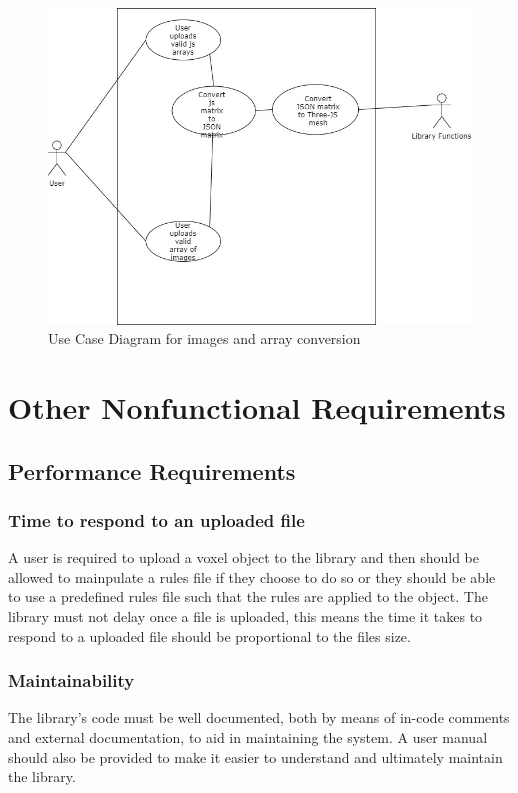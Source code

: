\documentclass[english]{article}
\begin{document}
	\begin{figure}[h]
		\includegraphics[width=\textwidth]{Use Cases/FileConversion.jpg}
		\caption{Use Case Diagram for images and array conversion }
	\end{figure}
	
	\pagebreak
	
	\section{Other Nonfunctional Requirements}
	
		\subsection{Performance Requirements}
		\subsubsection {Time to respond to an uploaded file}
		A user is required to upload a voxel object to the library and then should be allowed to mainpulate a rules file if they choose to do so or they should be able to use a predefined rules file such that the rules are applied to the object. The library must not delay once a file is uploaded, this means the time it takes to respond to a uploaded file should be proportional to the files size.
		
		\subsubsection{Maintainability}
		The library's code must be well documented, both by means of in-code comments and external documentation, to aid in 
		maintaining the system. A user manual should also be provided to make it easier to understand and ultimately maintain the library.
		
\end{document}
